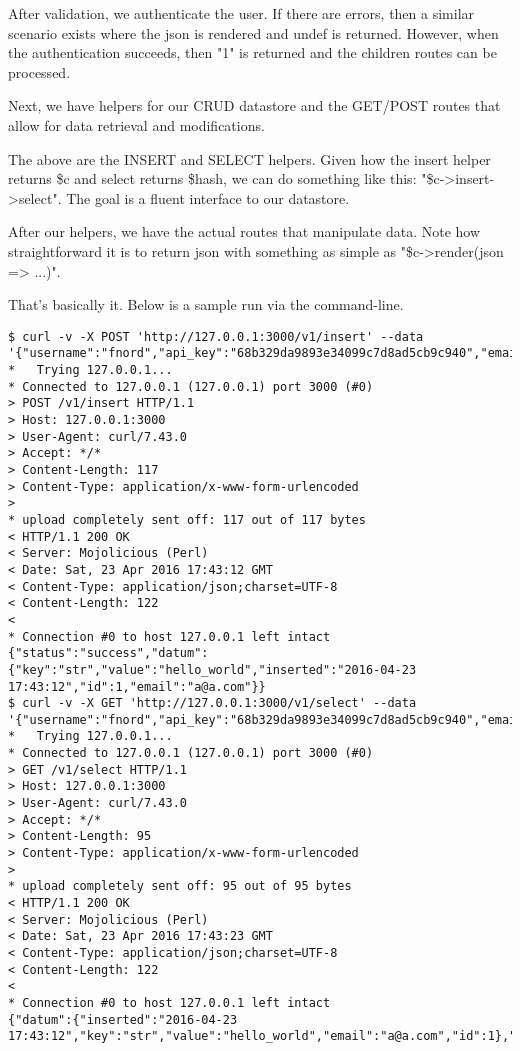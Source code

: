 \documentclass[14pt]{extreport}
\newcommand\Small{\fontsize{12}{13.0}\fontencoding{T1}\selectfont}
\newcommand*\LSTfont{\Small\ttfamily\SetTracking{encoding=*}{-60}\lsstyle}
\begin{document}


After validation, we authenticate the user.  If there are errors, then a
similar scenario exists where the json is rendered and undef is returned.
However, when the authentication succeeds, then "1" is returned and the 
children routes can be processed.



Next, we have helpers for our CRUD datastore and the GET/POST routes that allow
for data retrieval and modifications.



The above are the INSERT and SELECT helpers.  Given how the insert helper returns \$c and
select returns \$hash, we can do something like this: "\$c->insert->select".  The goal
is a fluent interface to our datastore.



After our helpers, we have the actual routes that manipulate data.  Note how straightforward
it is to return json with something as simple as "\$c->render(json => ...)".

That's basically it.  Below is a sample run via the command-line.

\begin{lstlisting}[style=BashOutputStyle]
$ curl -v -X POST 'http://127.0.0.1:3000/v1/insert' --data '{"username":"fnord","api_key":"68b329da9893e34099c7d8ad5cb9c940","email":"a@a.com","key":"str","value":"hello_world"}'
*   Trying 127.0.0.1...
* Connected to 127.0.0.1 (127.0.0.1) port 3000 (#0)
> POST /v1/insert HTTP/1.1
> Host: 127.0.0.1:3000
> User-Agent: curl/7.43.0
> Accept: */*
> Content-Length: 117
> Content-Type: application/x-www-form-urlencoded
> 
* upload completely sent off: 117 out of 117 bytes
< HTTP/1.1 200 OK
< Server: Mojolicious (Perl)
< Date: Sat, 23 Apr 2016 17:43:12 GMT
< Content-Type: application/json;charset=UTF-8
< Content-Length: 122
< 
* Connection #0 to host 127.0.0.1 left intact
{"status":"success","datum":{"key":"str","value":"hello_world","inserted":"2016-04-23 17:43:12","id":1,"email":"a@a.com"}}
$ curl -v -X GET 'http://127.0.0.1:3000/v1/select' --data '{"username":"fnord","api_key":"68b329da9893e34099c7d8ad5cb9c940","email":"a@a.com","key":"str"}'
*   Trying 127.0.0.1...
* Connected to 127.0.0.1 (127.0.0.1) port 3000 (#0)
> GET /v1/select HTTP/1.1
> Host: 127.0.0.1:3000
> User-Agent: curl/7.43.0
> Accept: */*
> Content-Length: 95
> Content-Type: application/x-www-form-urlencoded
> 
* upload completely sent off: 95 out of 95 bytes
< HTTP/1.1 200 OK
< Server: Mojolicious (Perl)
< Date: Sat, 23 Apr 2016 17:43:23 GMT
< Content-Type: application/json;charset=UTF-8
< Content-Length: 122
< 
* Connection #0 to host 127.0.0.1 left intact
{"datum":{"inserted":"2016-04-23 17:43:12","key":"str","value":"hello_world","email":"a@a.com","id":1},"status":"success"}
\end{lstlisting}
\end{document}
